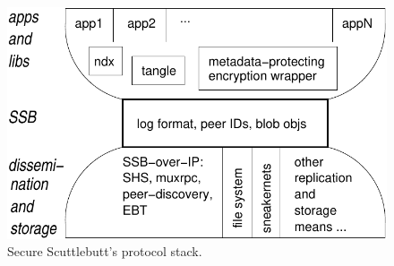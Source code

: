 \documentclass[sigconf]{acmart}
\begin{document}
\begin{figure}[htb]
  \includegraphics[width=0.9\columnwidth]{figs/ssb-waist.pdf}
  \caption{Secure Scuttlebutt's protocol stack.}
  \label{fig:waist}
\end{figure}
\end{document}
